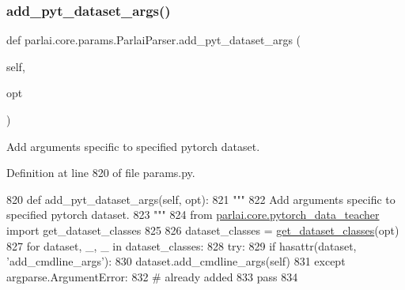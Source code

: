 \subsubsection{\texorpdfstring{add\+\_\+pyt\+\_\+dataset\+\_\+args()}{add\_pyt\_dataset\_args()}}
{\footnotesize\ttfamily def parlai.\+core.\+params.\+Parlai\+Parser.\+add\+\_\+pyt\+\_\+dataset\+\_\+args (\begin{DoxyParamCaption}\item[{}]{self,  }\item[{}]{opt }\end{DoxyParamCaption})}

\begin{DoxyVerb}Add arguments specific to specified pytorch dataset.
\end{DoxyVerb}
 

Definition at line 820 of file params.\+py.


\begin{DoxyCode}
820     \textcolor{keyword}{def }add\_pyt\_dataset\_args(self, opt):
821         \textcolor{stringliteral}{"""}
822 \textcolor{stringliteral}{        Add arguments specific to specified pytorch dataset.}
823 \textcolor{stringliteral}{        """}
824         \textcolor{keyword}{from} \hyperlink{namespaceparlai_1_1core_1_1pytorch__data__teacher}{parlai.core.pytorch\_data\_teacher} \textcolor{keyword}{import} get\_dataset\_classes
825 
826         dataset\_classes = \hyperlink{namespaceparlai_1_1core_1_1pytorch__data__teacher_acd56d9ac5d68831c1e91690f26eb2328}{get\_dataset\_classes}(opt)
827         \textcolor{keywordflow}{for} dataset, \_, \_ \textcolor{keywordflow}{in} dataset\_classes:
828             \textcolor{keywordflow}{try}:
829                 \textcolor{keywordflow}{if} hasattr(dataset, \textcolor{stringliteral}{'add\_cmdline\_args'}):
830                     dataset.add\_cmdline\_args(self)
831             \textcolor{keywordflow}{except} argparse.ArgumentError:
832                 \textcolor{comment}{# already added}
833                 \textcolor{keywordflow}{pass}
834 
\end{DoxyCode}
\mbox{\label{classparlai_1_1core_1_1params_1_1ParlaiParser_a037989eca768126b981270b2bdf06b0c}} 
